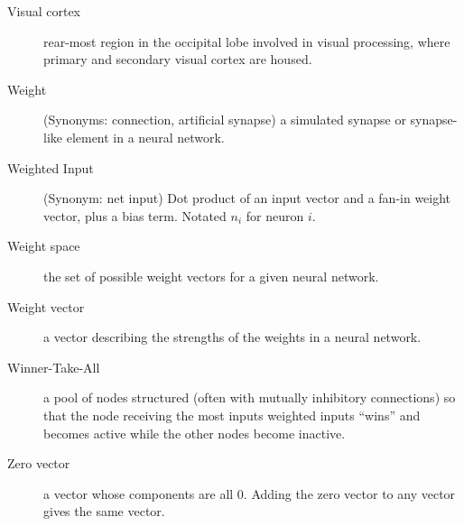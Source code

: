 \begin{description}
\item[Visual cortex] rear-most region in the occipital lobe involved in visual processing, where primary and secondary visual cortex are housed.

\item[Weight] (Synonyms: connection, artificial synapse) a simulated synapse or synapse-like element in a neural network. 

\item[Weighted Input] (Synonym: net input)  Dot product of an input vector and a fan-in weight vector, plus a bias term. Notated $n_i$ for neuron $i$.

\item[Weight space] the set of possible weight vectors for a given neural network.

\item[Weight vector] a vector describing the strengths of the weights in a neural network.

\item[Winner-Take-All] a pool of nodes structured (often with mutually inhibitory connections) so that the node receiving the most inputs weighted inputs ``wins'' and becomes active while the other nodes become inactive.

\item[Zero vector] a vector whose components are all $0$. Adding the zero vector to any vector gives the same vector.

\end{description}